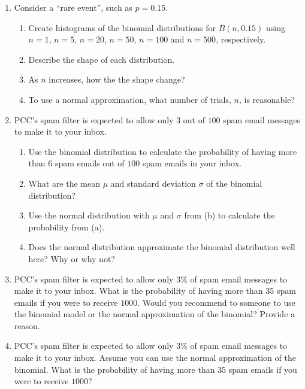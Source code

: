 \begin{enumerate}
 \item Consider a ``rare event'', such as \(p = 0.15\).
  \begin{enumerate}
  \item Create histograms of the binomial distributions for \(B(n,0.15)\) using \(n=1\), \(n=5\), \(n=20\), \(n=50\), \(n=100\) and \(n=500\), respectively. 
  \item Describe the shape of each distribution.
  \item As \(n\) increases, how the the shape change?
  \item To use a normal approximation, what number of trials, \(n\), is reasonable?
  \end{enumerate}

 \item PCC's spam filter is expected to allow only \(3\) out of \(100\) spam email messages to make it to your inbox.
  \begin{enumerate}
  \item Use the binomial distribution to calculate the probability of having more than \(6\) spam emails out of \(100\) spam emails in your inbox.
  \item What are the mean \( \mu \) and standard deviation \( \sigma \) of the binomial distribution?
  \item Use the normal distribution with \( \mu \) and \( \sigma \) from (b) to calculate the probability from (a).
  \item Does the normal distribution approximate the binomial distribution well here? Why or why not?
  \end{enumerate}
 \item PCC's spam filter is expected to allow only \(3\%\) of spam email messages to make it to your inbox. What is the probability of having more than \(35\) spam emails if you were to receive \(1000\). Would you recommend to someone to use the binomial model or the normal approximation of the binomial? Provide a reason.

 \item PCC's spam filter is expected to allow only \(3\%\) of spam email messages to make it to your inbox. Assume you can use the normal approximation of the binomial. What is the probability of having more than \(35\) spam emails if you were to receive \(1000\)?
\end{enumerate}